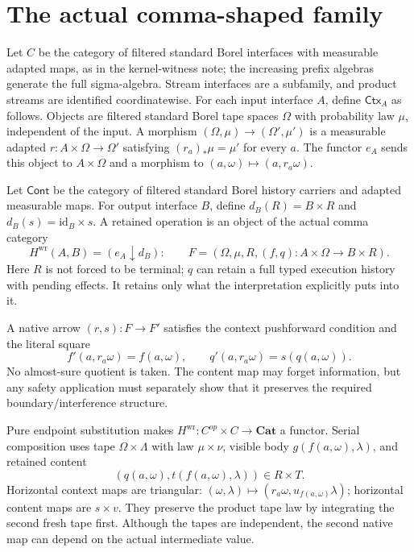 \documentclass[11pt]{article}
\begin{document}
\section{The actual comma-shaped family}
Let $C$ be the category of filtered standard Borel interfaces with measurable adapted maps, as in the kernel-witness note; the increasing prefix algebras generate the full sigma-algebra. Stream interfaces are a subfamily, and product streams are identified coordinatewise. For each input interface $A$, define $\mathsf{Ctx}_A$ as follows. Objects are filtered standard Borel tape spaces $\Omega$ with probability law $\mu$, independent of the input. A morphism $(\Omega,\mu)\to(\Omega',\mu')$ is a measurable adapted $r:A\times\Omega\to\Omega'$ satisfying $(r_a)_*\mu=\mu'$ for every $a$. The functor $e_A$ sends this object to $A\times\Omega$ and a morphism to $(a,\omega)\mapsto(a,r_a\omega)$.

Let $\mathsf{Cont}$ be the category of filtered standard Borel history carriers and adapted measurable maps. For output interface $B$, define $d_B(R)=B\times R$ and $d_B(s)=\mathrm{id}_B\times s$. A retained operation is an object of the actual comma category
\[
 H^{\mathrm{wr}}(A,B)=(e_A\downarrow d_B):
 \qquad F=(\Omega,\mu,R,(f,q):A\times\Omega\to B\times R).
\]
Here $R$ is not forced to be terminal; $q$ can retain a full typed execution history with pending effects. It retains only what the interpretation explicitly puts into it.

A native arrow $(r,s):F\to F'$ satisfies the context pushforward condition and the literal square
\[
 f'(a,r_a\omega)=f(a,\omega),\qquad
 q'(a,r_a\omega)=s(q(a,\omega)).\tag{N}
\]
No almost-sure quotient is taken. The content map may forget information, but any safety application must separately show that it preserves the required boundary/interference structure.

Pure endpoint substitution makes $H^{\mathrm{wr}}:C^{op}\times C\to\mathbf{Cat}$ a functor. Serial composition uses tape $\Omega\times\Lambda$ with law $\mu\times\nu$, visible body $g(f(a,\omega),\lambda)$, and retained content
\[
 (q(a,\omega),t(f(a,\omega),\lambda))\in R\times T.
\]
Horizontal context maps are triangular: $(\omega,\lambda)\mapsto(r_a\omega,u_{f(a,\omega)}\lambda)$; horizontal content maps are $s\times v$. They preserve the product tape law by integrating the second fresh tape first. Although the tapes are independent, the second native map can depend on the actual intermediate value.
\end{document}

